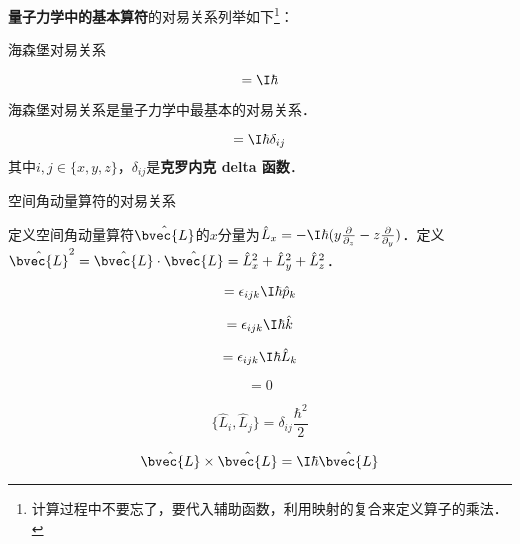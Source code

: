 \textbf{量子力学中的基本算符}的对易关系列举如下\footnote{计算过程中不要忘了，要代入辅助函数，利用映射的复合来定义算子的乘法．}：

\begin{theorem}{海森堡对易关系}\label{ComOpQ_the5}

\begin{equation}
[\hat{x}, \hat{p}_x] = \I\hbar
\end{equation}

\end{theorem}



海森堡对易关系是量子力学中最基本的对易关系．



\begin{corollary}{}\label{ComOpQ_cor1}

\begin{equation}
[\hat{i}, \hat{p}_j]=\I\hbar\delta_{ij}
\end{equation}
其中$i, j\in\{x, y, z\}$，$\delta_{ij}$是\textbf{克罗内克 delta 函数}．
\end{corollary}

\begin{theorem}{空间角动量算符的对易关系}\label{ComOpQ_the6}

定义空间角动量算符$\hat{\bvec{L}}$的$x$分量为$\hat{L}_x=-\I\hbar(y\frac{\partial}{\partial_z}-z\frac{\partial}{\partial _y})$．定义$\hat{\bvec{L}}^2=\hat{\bvec{L}}\cdot \hat{\bvec{L}}=\hat{L}_x^2+\hat{L}_y^2+\hat{L}_z^2$．


\begin{equation}
[\hat{p}_i, \hat{L}_j]=\epsilon_{ijk}\I\hbar\hat{p}_k
\end{equation}


\begin{equation}
[\hat{i}, \hat{L}_j]=\epsilon_{ijk}\I\hbar\hat{k}
\end{equation}



\begin{equation}
[\hat{L}_i, \hat{L}_j]=\epsilon_{ijk}\I\hbar\hat{L}_k
\end{equation}

\begin{equation}
[\hat{\bvec{L}}^2, \hat{L}_i]=0
\end{equation}

\begin{equation}
\{\hat{L}_i, \hat{L}_j\}=\delta_{ij}\frac{\hbar^2}{2}
\end{equation}

\begin{equation}
\hat{\bvec{L}}\times\hat{\bvec{L}}=\I\hbar \hat{\bvec{L}}
\end{equation}

\end{theorem}




